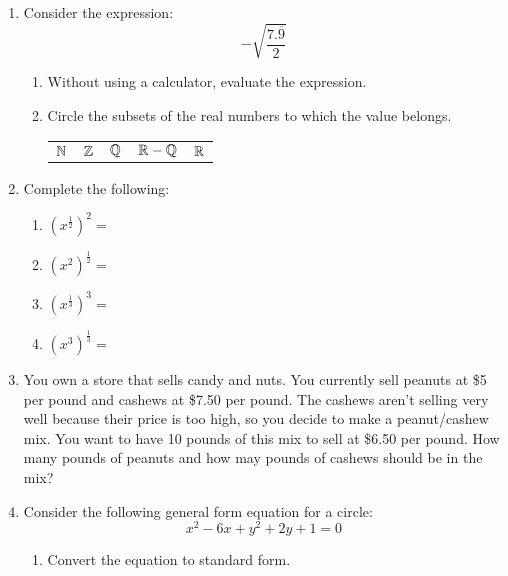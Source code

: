 \documentclass[letterpaper,12pt,fleqn]{article}
\begin{document}
\begin{enumerate}[left=0pt]
\item Consider the expression:
  \[-\sqrt{\frac{7.\overline{9}}{2}}\]
  \begin{enumerate}
  \item Without using a calculator, evaluate the expression.

    \vspace{1in}
    
  \item Circle the subsets of the real numbers to which the value belongs.

    \vspace{0.25in}

    \begin{tabular}{p{1in}p{1in}p{1in}p{1in}p{1in}}
      \(\mathbb{N}\) & \(\mathbb{Z}\) & \(\mathbb{Q}\) & \(\mathbb{R}-\mathbb{Q}\) & \(\mathbb{R}\)
    \end{tabular}
  \end{enumerate}

  \bigskip

\item Complete the following:
  \begin{enumerate}
  \item \(\displaystyle\left(x^{\frac{1}{2}}\right)^2=\)
  \item \(\displaystyle\left(x^2\right)^{\frac{1}{2}}=\)
  \item \(\displaystyle\left(x^{\frac{1}{3}}\right)^3=\)
  \item \(\displaystyle\left(x^3\right)^{\frac{1}{3}}=\)
  \end{enumerate}

  \newpage

\item You own a store that sells candy and nuts.  You currently sell peanuts at \$5 per pound and cashews at \$7.50
  per pound.  The cashews aren't selling very well because their price is too high, so you decide to make a
  peanut/cashew mix.  You want to have 10 pounds of this mix to sell at \$6.50 per pound.  How many pounds of
  peanuts and how may pounds of cashews should be in the mix?

  \newpage

\item Consider the following general form equation for a circle:
  \[x^2-6x+y^2+2y+1=0\]
  \begin{enumerate}
  \item Convert the equation to standard form.


\end{enumerate}
\end{enumerate}
\end{document}
